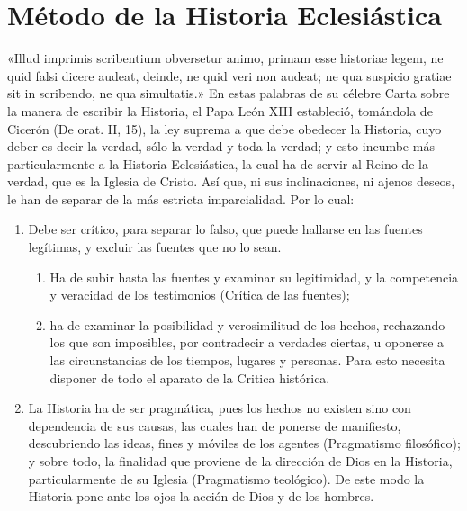 \raggedbottom{} \documentclass[12pt, a4paper]{book}
\begin{document}
\section{Método de la Historia Eclesiástica}
«Illud imprimis scribentium obversetur animo, primam esse historiae legem, ne quid falsi dicere audeat, deinde, ne quid veri non audeat; ne qua suspicio gratiae sit in scribendo, ne qua simultatis.» En estas palabras de su célebre Carta sobre la manera de escribir la Historia, el Papa León XIII estableció, tomándola de Cicerón (De orat. II, 15), la ley suprema a que debe obedecer la Historia, cuyo deber es decir la verdad, sólo la verdad y toda la verdad; y esto incumbe más particularmente a la Historia Eclesiástica, la cual ha de servir al Reino de la verdad, que es la Iglesia de Cristo. Así que, ni sus inclinaciones, ni ajenos deseos, le han de separar de la más estricta imparcialidad. Por lo cual: \begin{enumerate}
  \item Debe ser crítico, para separar lo falso, que puede hallarse en las fuentes legítimas, y excluir las fuentes que no lo sean.\begin{enumerate}
          \item Ha de subir hasta las fuentes y examinar su legitimidad, y la competencia y veracidad de los testimonios (Crítica de las fuentes);
          \item ha de examinar la posibilidad y verosimilitud de los hechos, rechazando los que son imposibles, por contradecir a verdades ciertas, u oponerse a las circunstancias de los tiempos, lugares y personas. Para esto necesita disponer de todo el aparato de la Critica histórica.
        \end{enumerate}
  \item La Historia ha de ser pragmática, pues los hechos no existen sino con dependencia de sus causas, las cuales han de ponerse de manifiesto, descubriendo las ideas, fines y móviles de los agentes (Pragmatismo filosófico); y sobre todo, la finalidad que proviene de la dirección de Dios en la Historia, particularmente de su Iglesia (Pragmatismo teológico). De este modo la Historia pone ante los ojos la acción de Dios y de los hombres.
\end{enumerate}
\end{document}
